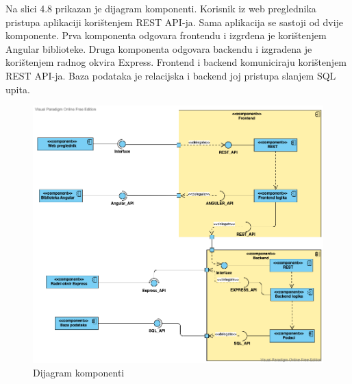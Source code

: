 			 Na slici 4.8 prikazan je dijagram komponenti. Korisnik iz web preglednika pristupa aplikaciji korištenjem REST API-ja. Sama aplikacija se sastoji od dvije komponente. Prva komponenta odgovara frontendu i izgrđena je korištenjem Angular biblioteke. Druga komponenta odgovara backendu i izgradena je korištenjem radnog okvira Express. Frontend i backend komuniciraju korištenjem REST API-ja. Baza podataka je relacijska i backend joj pristupa slanjem SQL upita.
			 
			 \begin{figure}[H]
			            \includegraphics[width=\textwidth]{slike/komponenti.vpd_1.png} %
			          \caption{Dijagram komponenti}
			            \label{fig:comp} %
		      \end{figure}